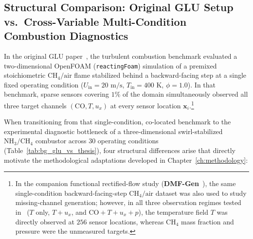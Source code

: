 \subsection{Structural Comparison: Original GLU Setup vs.\ Cross-Variable Multi-Condition Combustion Diagnostics}
\label{subsec:bg_glu_comparison}

In the original GLU paper~\cite{wang2026glu}, the turbulent combustion benchmark evaluated a two-dimensional OpenFOAM (\texttt{reactingFoam}) simulation of a premixed stoichiometric $\text{CH}_4/\text{air}$ flame stabilized behind a backward-facing step at a single fixed operating condition ($U_{\text{in}} = 20\text{ m/s}$, $T_{\text{in}} = 400\text{ K}$, $\phi = 1.0$). In that benchmark, sparse sensors covering $1\%$ of the domain simultaneously observed all three target channels $(\text{CO}, T, u_x)$ at every sensor location $\mathbf{x}_i$.\footnote{In the companion functional rectified-flow study (\textbf{DMF-Gen}~\cite{wang2026dmfgen}), the same single-condition backward-facing-step $\text{CH}_4/\text{air}$ dataset was also used to study missing-channel generation; however, in all three observation regimes tested in~\cite{wang2026dmfgen} ($T$ only, $T + u_x$, and $\text{CO} + T + u_x + p$), the temperature field $T$ was directly observed at $256$ sensor locations, whereas $\text{CH}_4$ mass fraction and pressure were the unmeasured targets.}

When transitioning from that single-condition, co-located benchmark to the experimental diagnostic bottleneck of a three-dimensional swirl-stabilized $\text{NH}_3/\text{CH}_4$ combustor across 30 operating conditions (Table~\ref{tab:bg_glu_vs_thesis}), four structural differences arise that directly motivate the methodological adaptations developed in Chapter~\ref{ch:methodology}:

